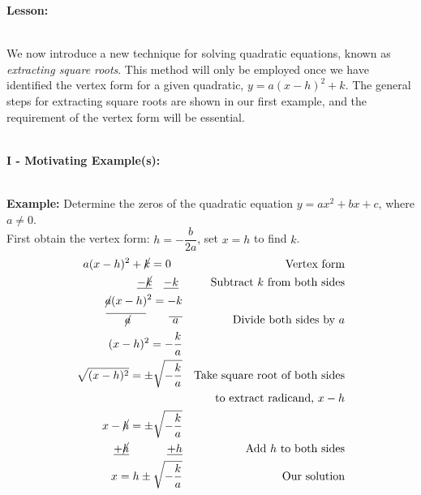 \documentclass[12pt]{article}
\theoremstyle{definition}
\begin{document}
{\bf Lesson:}\\
\ \par
We now introduce a new technique for solving quadratic equations, known as {\it extracting square roots}.  This method will only be employed once we have identified the vertex form for a given quadratic, $y=a(x-h)^2+k$.  The general steps for extracting square roots are shown in our first example, and the requirement of the vertex form will be essential.\\
\ \par
{\bf I - Motivating Example(s):}\\
\ \par
{\bf Example:} Determine the zeros of the quadratic equation $y=ax^2+bx+c$, where $a\neq 0$.\\
First obtain the vertex form:  $h=-\dfrac{b}{2a}$, set $x=h$ to find $k$.
\begin{eqnarray*}
a(x-h)^2+\cancel{k}=0~~~ & &\text{Vertex~form}\\
\underline{-\cancel{k}}~~~\underline{-k}~ & & \text{Subtract~} k \text{~from~both~sides}\\
\cancel{a}(x-h)^2=-k & &\\
\overline{~~~~~\cancel{a}~~~~}~~~~~~\overline{~a~} & &  \text{Divide~both~sides~by~} a\\
(x-h)^2=-\frac{k}{a}& &\\
\sqrt{(x-h)^2}=\pm\sqrt{-\frac{k}{a}}& &\text{Take~square~root~of~both~sides}\\
& & ~~~\text{to~extract~radicand,~} x-h\\
x-\cancel{h}=\pm\sqrt{-\frac{k}{a}} & & \\
\underline{+\cancel{h}}~~~~~~~~~~\underline{+h} & & \text{Add~} h \text{~to~both~sides}\\
x=h\pm\sqrt{-\frac{k}{a}} & & \text{Our~solution}
\end{eqnarray*}
\end{document}
